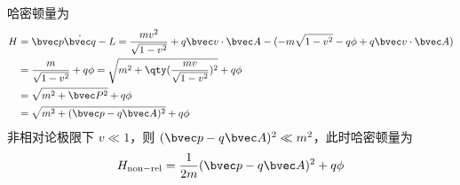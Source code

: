 哈密顿量为
\begin{equation}
\begin{aligned}
H&=\bvec p \dot{\bvec q}-L=\frac{mv^2}{\sqrt{1-v^2}}+q\bvec v\cdot \bvec A-(-m\sqrt{1-v^2}-q\phi+q\bvec v\cdot \bvec A)\\
&=\frac{m}{\sqrt{1-v^2}}+q\phi=\sqrt{m^2+\qty(\frac{mv}{\sqrt{1-v^2}})^2}+q\phi\\
&=\sqrt{m^2+\bvec P^2}+q\phi\\
&=\sqrt{m^2+(\bvec p-q\bvec A)^2}+q\phi
\end{aligned}
\end{equation}
非相对论极限下 $v\ll 1$，则 $(\bvec p-q\bvec A)^2 \ll m^2$，此时哈密顿量为
\begin{equation}
H_{\rm{non-rel}}=\frac{1}{2m}(\bvec p-q\bvec A)^2+q\phi
\end{equation}